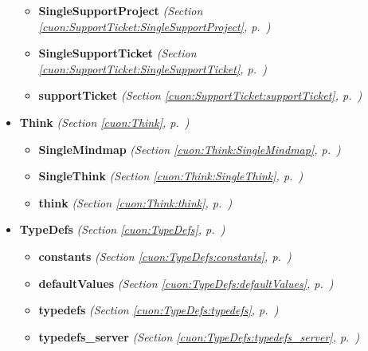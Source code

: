 \begin{itemize}
  \begin{itemize}
\setlength{\parskip}{0ex}
    \item \textbf{SingleSupportProject}
  \textit{(Section \ref{cuon:SupportTicket:SingleSupportProject}, p.~\pageref{cuon:SupportTicket:SingleSupportProject})}

    \item \textbf{SingleSupportTicket}
  \textit{(Section \ref{cuon:SupportTicket:SingleSupportTicket}, p.~\pageref{cuon:SupportTicket:SingleSupportTicket})}

    \item \textbf{supportTicket}
  \textit{(Section \ref{cuon:SupportTicket:supportTicket}, p.~\pageref{cuon:SupportTicket:supportTicket})}

  \end{itemize}
\item \textbf{Think}
  \textit{(Section \ref{cuon:Think}, p.~\pageref{cuon:Think})}

  \begin{itemize}
\setlength{\parskip}{0ex}
    \item \textbf{SingleMindmap}
  \textit{(Section \ref{cuon:Think:SingleMindmap}, p.~\pageref{cuon:Think:SingleMindmap})}

    \item \textbf{SingleThink}
  \textit{(Section \ref{cuon:Think:SingleThink}, p.~\pageref{cuon:Think:SingleThink})}

    \item \textbf{think}
  \textit{(Section \ref{cuon:Think:think}, p.~\pageref{cuon:Think:think})}

  \end{itemize}
\item \textbf{TypeDefs}
  \textit{(Section \ref{cuon:TypeDefs}, p.~\pageref{cuon:TypeDefs})}

  \begin{itemize}
\setlength{\parskip}{0ex}
    \item \textbf{constants}
  \textit{(Section \ref{cuon:TypeDefs:constants}, p.~\pageref{cuon:TypeDefs:constants})}

    \item \textbf{defaultValues}
  \textit{(Section \ref{cuon:TypeDefs:defaultValues}, p.~\pageref{cuon:TypeDefs:defaultValues})}

    \item \textbf{typedefs}
  \textit{(Section \ref{cuon:TypeDefs:typedefs}, p.~\pageref{cuon:TypeDefs:typedefs})}

    \item \textbf{typedefs\_server}
  \textit{(Section \ref{cuon:TypeDefs:typedefs_server}, p.~\pageref{cuon:TypeDefs:typedefs_server})}


\end{itemize}
\end{itemize}
